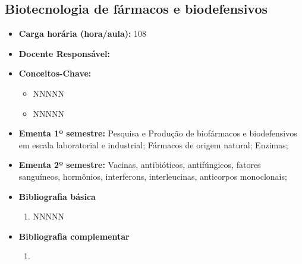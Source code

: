\documentclass[11pt,fleqn]{book} %
\begin{document}
\newpage
\subsection{Biotecnologia de fármacos e biodefensivos}\label{disc:biotecFarmacos}
\begin{itemize}
	\item \textbf{Carga horária (hora/aula):} 108
	\item \textbf{Docente Responsável:}
	\item \textbf{Conceitos-Chave:}
	\begin{itemize}
		\item NNNNN
		\item NNNNN
	\end{itemize}
	\item \textbf{Ementa 1º semestre:}	 
	Pesquisa e Produção de biofármacos e biodefensivos em escala laboratorial e industrial;
	Fármacos de origem natural;
	Enzimas;
	\item \textbf{Ementa 2º semestre:}	
	Vacinas, antibióticos, antifúngicos, fatores sanguíneos, hormônios, interferons, interleucinas, anticorpos monoclonais; 
	\item \textbf{Bibliografia básica}
	\begin{enumerate}
		\item NNNNN
	\end{enumerate}
	\item \textbf{Bibliografia complementar}
	\begin{enumerate}
		\item 
	\end{enumerate}	
\end{itemize}

\newpage
\end{document}
